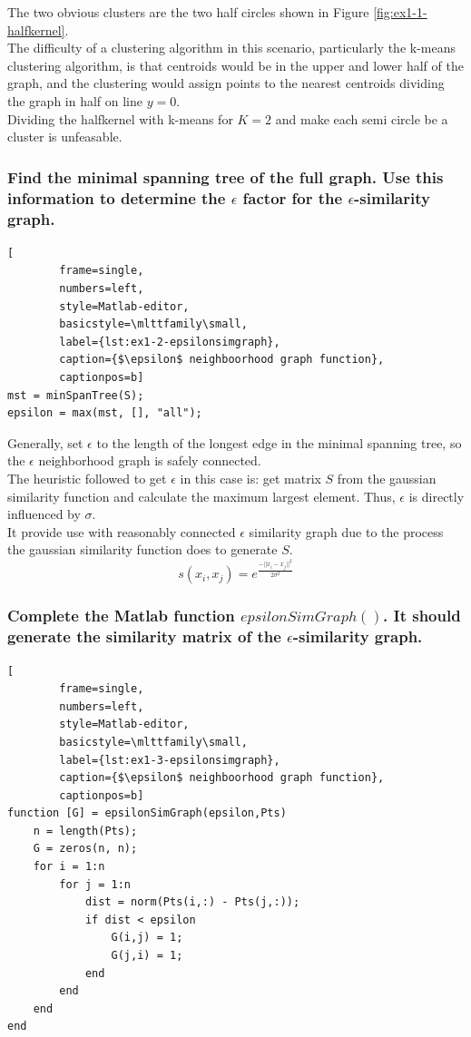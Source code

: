 \documentclass[unicode,11pt,a4paper,oneside,numbers=endperiod,openany]{scrartcl}
\begin{document}
The two obvious clusters are the two half circles shown in Figure \ref{fig:ex1-1-halfkernel}.\\
The difficulty of a clustering algorithm in this scenario, particularly the k-means clustering algorithm,
is that centroids would be in the upper and lower half of the graph,
and the clustering would assign points to the nearest centroids dividing the graph in half on line $y=0$.\\
Dividing the halfkernel with k-means for $K=2$ and make each semi circle be a cluster is unfeasable.

\subsubsection{
    Find the minimal spanning tree of the full graph.
    Use this information to determine the $\epsilon$ factor for the $\epsilon$-similarity graph.}

\begin{lstlisting}[
        frame=single,
        numbers=left,
        style=Matlab-editor,
        basicstyle=\mlttfamily\small,
        label={lst:ex1-2-epsilonsimgraph},
        caption={$\epsilon$ neighboorhood graph function},
        captionpos=b]
mst = minSpanTree(S);
epsilon = max(mst, [], "all");
\end{lstlisting}
Generally, set $\epsilon$ to the length of the longest edge in the minimal spanning tree,
so the $\epsilon$ neighborhood graph is safely connected.\\
The heuristic followed to get $\epsilon$ in this case is: get matrix $S$ from the gaussian similarity function and
calculate the maximum largest element.
Thus, $\epsilon$ is directly influenced by $\sigma$.\\
It provide use with reasonably connected $\epsilon$ similarity graph due to the process
the gaussian similarity function does to generate $S$.
\[
    s(x_i, x_j) = e^{\frac{-||x_i - x_j||^2}{2\sigma^2}}
\]


\subsubsection{
    Complete the Matlab function $epsilonSimGraph()$.
    It should generate the similarity matrix of the $\epsilon$-similarity graph.}

\begin{lstlisting}[
        frame=single,
        numbers=left,
        style=Matlab-editor,
        basicstyle=\mlttfamily\small,
        label={lst:ex1-3-epsilonsimgraph},
        caption={$\epsilon$ neighboorhood graph function},
        captionpos=b]
function [G] = epsilonSimGraph(epsilon,Pts)
    n = length(Pts);
    G = zeros(n, n);
    for i = 1:n
        for j = 1:n
            dist = norm(Pts(i,:) - Pts(j,:));
            if dist < epsilon
                G(i,j) = 1;
                G(j,i) = 1;
            end
        end
    end
end
\end{lstlisting}
\end{document}
